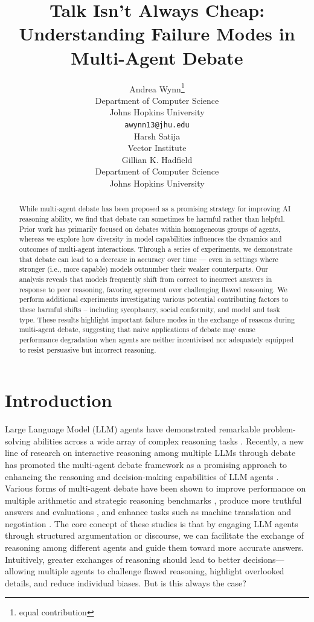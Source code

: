 \documentclass{article}
\title{Talk Isn’t Always Cheap: \\ Understanding Failure Modes in Multi-Agent Debate}
\author{%
  Andrea Wynn\thanks{equal contribution} \\
  Department of Computer Science\\
  Johns Hopkins University\\
  \texttt{awynn13@jhu.edu}\\
  \And
  Harsh Satija\footnotemark[1] \\
  Vector Institute \\
  \And 
  Gillian K. Hadfield \\
  Department of Computer Science\\
  Johns Hopkins University\\
}
\begin{document}
\maketitle

\begin{abstract}
While multi-agent debate has been proposed as a promising strategy for improving AI reasoning ability, we find that debate can sometimes be harmful rather than helpful.
Prior work has primarily focused on debates within homogeneous groups of agents, whereas we explore how diversity in model capabilities influences the dynamics and outcomes of multi-agent interactions. Through a series of experiments, we demonstrate that debate can lead to a decrease in accuracy over time — even in settings where stronger (i.e., more capable) models outnumber their weaker counterparts.
Our analysis reveals that models frequently shift from correct to incorrect answers in response to peer reasoning, favoring agreement over challenging flawed reasoning. We perform additional experiments investigating various potential contributing factors to these harmful shifts -- including sycophancy, social conformity, and model and task type. 
These results highlight important failure modes in the exchange of reasons during multi-agent debate, suggesting that naive applications of debate may cause performance degradation when agents are neither incentivised nor adequately equipped to resist persuasive but incorrect reasoning.
\end{abstract}

\section{Introduction}
\label{sec:intro}


Large Language Model (LLM) agents have demonstrated remarkable problem-solving abilities across a wide array of complex reasoning tasks \citep{brown2020language}.
Recently, a new line of research on interactive reasoning among multiple LLMs through debate has promoted the multi-agent debate framework as a promising approach to enhancing the reasoning and decision-making capabilities of LLM agents \citep{du2023improvingfactualityreasoninglanguage, chan2023chateval, liang2023encouraging, khan2024debatingpersuasivellmsleads}. Various forms of multi-agent debate have been shown to improve performance on multiple arithmetic and strategic reasoning benchmarks \citep{du2023improvingfactualityreasoninglanguage, subramaniam2025multiagent}, produce more truthful answers and evaluations \citep{chan2023chateval, khan2024debatingpersuasivellmsleads}, and enhance tasks such as machine translation \citep{liang2023encouraging} and negotiation \citep{fu2023improving}.
The core concept of these studies is that by engaging LLM agents through structured argumentation or discourse, we can facilitate the exchange of reasoning among different agents and guide them toward more accurate answers. Intuitively, greater exchanges of reasoning should lead to better decisions—allowing multiple agents to challenge flawed reasoning, highlight overlooked details, and reduce individual biases. But is this always the case?
\end{document}
